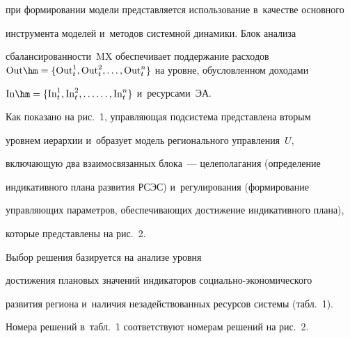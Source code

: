 при формировании модели пред\-став\-ля\-ет\-ся использование в~качестве основного 


инструмента моделей и~методов сис\-тем\-ной динамики. Блок анализа 


сбалансированности~$\mathrm{MX}$ обеспечивает поддержание расходов $\mathrm{Out} \hm= \{ 


\mathrm{Out}_t^1, \mathrm{Out}_t^2,\ldots , \mathrm{Out}_t^n\}$ на уровне, обуслов\-лен\-ном доходами 


$\mathrm{In}\hm= 


\{ \mathrm{In}_t^1, \mathrm{In}_t^2,\ldots \linebreak \ldots ,\mathrm{In}_t^n\}$ и~ресурсами~ЭА. 











  


  Как показано на рис.~1, управ\-ля\-ющая под\-сис\-те\-ма пред\-став\-ле\-на вторым 


уров\-нем иерархии и~образует модель регионального управ\-ле\-ния~$U$, 


вклю\-ча\-ющую два взаимосвязанных блока~--- целеполагания (определение 


индикативного плана развития РСЭС) и~регулирования (формирование 


управ\-ля\-ющих па\-ра\-мет\-ров, обеспечивающих до\-сти\-же\-ние индикативного плана), 


которые пред\-став\-ле\-ны на рис.~2. 





Выбор решения базируется на анализе уров\-ня 


достижения плановых значений индикаторов со\-ци\-аль\-но-эко\-но\-ми\-че\-ско\-го 


развития региона и~наличия незадействованных ресурсов сис\-те\-мы (табл.~1). 


Номера решений в~табл.~1 соответствуют номерам решений на рис.~2.


  


